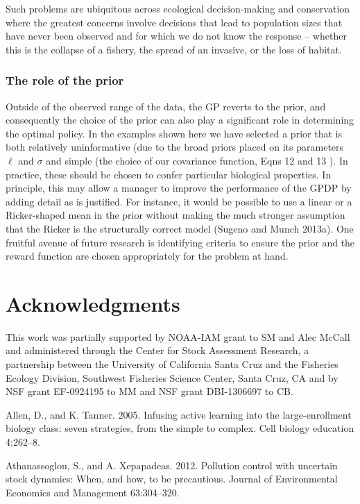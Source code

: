\documentclass[author-year, 12pt,review]{components/elsarticle} %
\begin{document}
Such problems are ubiquitous across ecological decision-making and
conservation where the greatest concerns involve decisions that lead to
population sizes that have never been observed and for which we do not
know the response -- whether this is the collapse of a fishery, the
spread of an invasive, or the loss of habitat.

\subsubsection{The role of the prior}\label{the-role-of-the-prior}

Outside of the observed range of the data, the GP reverts to the prior,
and consequently the choice of the prior can also play a significant
role in determining the optimal policy. In the examples shown here we
have selected a prior that is both relatively uninformative (due to the
broad priors placed on its parameters $\ell$ and $\sigma$ and simple
(the choice of our covariance function, Eqns 12 and 13 ). In practice,
these should be chosen to confer particular biological properties. In
principle, this may allow a manager to improve the performance of the
GPDP by adding detail as is justified. For instance, it would be
possible to use a linear or a Ricker-shaped mean in the prior without
making the much stronger assumption that the Ricker is the structurally
correct model (Sugeno and Munch 2013a). One fruitful avenue of future
research is identifying criteria to ensure the prior and the reward
function are chosen appropriately for the problem at hand.

\section{Acknowledgments}\label{acknowledgments}

This work was partially supported by NOAA-IAM grant to SM and Alec
McCall and administered through the Center for Stock Assessment
Research, a partnership between the University of California Santa Cruz
and the Fisheries Ecology Division, Southwest Fisheries Science Center,
Santa Cruz, CA and by NSF grant EF-0924195 to MM and NSF grant
DBI-1306697 to CB.

Allen, D., and K. Tanner. 2005. Infusing active learning into the
large-enrollment biology class: seven strategies, from the simple to
complex. Cell biology education 4:262--8.

Athanassoglou, S., and A. Xepapadeas. 2012. Pollution control with
uncertain stock dynamics: When, and how, to be precautious. Journal of
Environmental Economics and Management 63:304--320.
\end{document}
